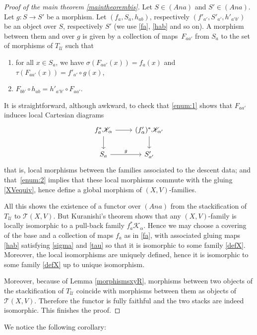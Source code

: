 \documentclass[JEP,XML,SOM,Unicode]{cedram}
\let\mathcal\mathscr
\newcommand{\Ana}{\mathit{Ana}}
\theoremstyle{plain}
\theoremstyle{definition}
\theoremstyle{remark}
\numberwithin{equation}{section}
\begin{document}
\begin{proof}[Proof of the main theorem \ref{maintheorembis}]
Let $S\in(\Ana)$ and $S'\in(\Ana)$. Let $g : S\to S'$ be a morphism. Let $(f_a,S_a, h_{ab})$, respectively $(f'_{a'}, S'_{a'}, h'_{a'b'})$ be an object over $S$, respectively $S'$ (we use \eqref{fa}, \eqref{hab} and so on). A morphism between them and over $g$ is given by a collection of maps~$F_{aa'}$ from $S_a$ to the set of morphisms of $T_{\mathcal U}$ such that
\begin{enumerate}
\item\label{enum:1}
for all $x\in S_a$, we have $\sigma (F_{aa'}(x))=f_a(x)$ and $\tau (F_{aa'}(x))=f'_{a'}\circ g(x)$,
\item\label{enum:2}
$F_{bb'}\circ h_{ab}=h'_{a'b'}\circ F_{aa'}$.
\end{enumerate}
It is straightforward, although awkward, to check that \eqref{enum:1} shows that $F_{aa'}$ induces local Cartesian diagrams
\begin{equation}
\label{XVCD}
\begin{tikzcd}
f_a^*\mathcal K_\alpha \arrow[r]\arrow[d] &(f'_\alpha)^*\mathcal K_{\alpha'}\arrow[d]\\
S_a\arrow[r,"g"] &S'_{a'}
\end{tikzcd}
\end{equation}
that is, local morphisms between the families associated to the descent data; and that~\eqref{enum:2} implies that these local morphisms commute with the gluing \eqref{XVequiv}, hence define a global morphism of $(X,V)$-families.

All this shows the existence of a functor over $(\Ana)$ from the stackification of~$T_{\mathcal U}$ to $\mathcal T(X, V)$. But Kuranishi's theorem shows that any $(X,V)$-family is locally isomorphic to a pull-back family $f_a^*\mathcal K_\alpha$. Hence we may choose a covering of the base and a collection of maps $f_a$ as in \eqref{fa}, with associated gluing maps \eqref{hab} satisfying \eqref{sigma} and \eqref{tau} so that it is isomorphic to some family \eqref{defX}. Moreover, the local isomorphisms are uniquely defined, hence it is isomorphic to some family \eqref{defX} up to unique isomorphism.

Moreover, because of Lemma \ref{morphismsxyR}, morphisms between two objects of the stackification of $T_{\mathcal U}$ coincide with morphisms between them as objects of $\mathcal T(X,V)$. Therefore the functor is fully faithful and the two stacks are indeed isomorphic.
This finishes the proof.
\end{proof}

We notice the following corollary:
\end{document}
